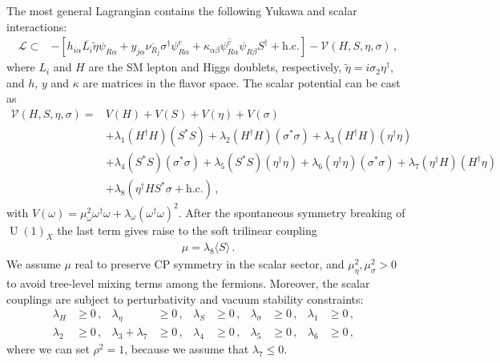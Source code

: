 \documentclass[12pt]{article}
\begin{document}
The most general Lagrangian contains the following Yukawa and scalar interactions:
%
\begin{align*}
\label{eq:LagY}
    \mathcal{L} \subset& -[ 
    h_{i\alpha} \overline{L_{i}} \tilde{\eta} \psi_{R\alpha} +  y_{j\alpha} \overline{\nu_{R_{j}}} \sigma^{\dagger} \psi^c_{R\alpha} + \kappa_{\alpha\beta} \overline{\psi^{c}_{R\alpha}} \psi_{R\beta} S^\dagger + \text{h.c.}] - \mathcal{V}(H, S, \eta, \sigma)\,,
\end{align*}
%
where $L_{i}$ and $H$ are the SM lepton and Higgs doublets, respectively,  $\widetilde{\eta} = i \sigma_2 \eta^{\dagger}$, and $h$, $y$ and $\kappa$ are matrices in the flavor space. 
The scalar potential can be cast as
%
\begin{align*}
    \mathcal{V}(H, S, \eta, \sigma) = & V(H) + V(S) + V(\eta) + V(\sigma) \\
    &+  \lambda_{1} (H^{\dagger} H ) (S^{*} S) + \lambda_{2} (H^{\dagger} H ) (\sigma^{*} \sigma ) + \lambda_{3} (H^{\dagger} H ) (\eta^{\dagger} \eta )\\
    &+ \lambda_{4} (S^{*} S) (\sigma^{*} \sigma ) + \lambda_{5} (S^{*} S) (\eta^{\dagger} \eta ) + \lambda_{6} (\eta^{\dagger} \eta ) (\sigma^{*} \sigma ) + \lambda_{7} (\eta^{\dagger} H ) (H^{\dagger} \eta ) \\
    &+ \lambda_{8} (\eta^{\dagger} H S^{*} \sigma + \text{h.c.})\,,
\end{align*}
%
with $V(\omega) = \mu^{2}_{\omega} \omega^{\dagger} \omega + \lambda_{\omega} (\omega^{\dagger} \omega)^{2}$. After the spontaneous symmetry breaking of $\operatorname{U}(1)_X$ the last term gives raise to the soft trilinear coupling
\begin{align}
  \mu=\lambda_8 \langle S \rangle\,.
\end{align}
We assume $\mu$ real to preserve CP symmetry in the scalar sector, and $\mu^2_\eta,\mu^2_\sigma>0$ to avoid tree-level mixing terms among the fermions. Moreover, the scalar couplings are subject to perturbativity and vacuum stability constraints:
\begin{align*}
\lambda_{H} &\geq 0\,, & \lambda_{\eta} &\geq 0\,, & \lambda_{S} &\geq 0\,, & \lambda_{\sigma} &\geq 0\,, & \lambda_{1} &\geq 0\,, & \\
\lambda_{2} &\geq 0\,, &
\lambda_{3}+\lambda_{7} &\geq 0\,, & \lambda_{4} &\geq 0\,, & \lambda_{5} &\geq 0\,, & \lambda_{6} &\geq 0\,,
\end{align*}
where we can set $\rho^{2} = 1$, because we assume that $\lambda_{7} \leq 0$.
\end{document}
